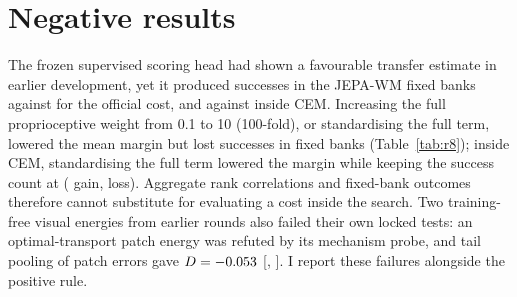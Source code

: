 \section{Negative results}
\label{sec:negative}
The frozen supervised scoring head had shown a favourable transfer estimate in earlier development, yet it produced \REightBoneSucc{} successes in the JEPA-WM fixed banks against \REightBzeroSucc{} for the
official cost, and \RNineBoneSucc{} against \RNineBzeroSucc{} inside CEM. Increasing the full proprioceptive weight
from 0.1 to 10 (100-fold), or standardising the full term, lowered the mean margin but lost successes in fixed banks
(Table~\ref{tab:r8}); inside CEM, standardising the full term lowered the margin while keeping the success count at
\RElCzoSucc{} (\RElScaleFullGain{} gain, \RElScaleFullLoss{} loss). Aggregate rank correlations and fixed-bank outcomes
therefore cannot substitute for evaluating a cost inside the search. Two training-free visual energies from earlier
rounds also failed their own locked tests: an optimal-transport patch energy was refuted by its mechanism probe, and
tail pooling of patch errors gave $D=-0.053$ [\RSevenTpeDLo, \RSevenTpeDHi]. I report these failures alongside the
positive rule.

